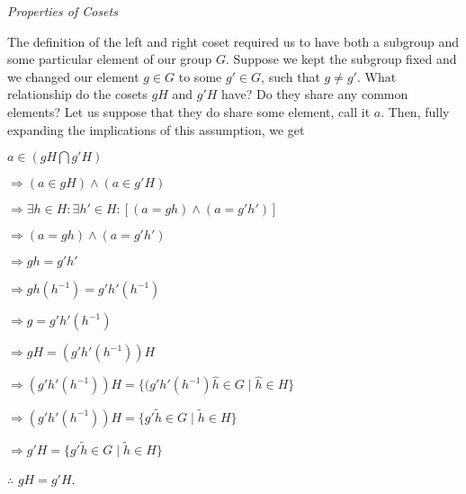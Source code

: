 \documentclass[12pt, a4paper]{article}
\begin{document}
\begin{flushleft}

    \large{\textit{Properties of Cosets}}

\end{flushleft}
    
    The definition of the left and right coset required us to have both a subgroup and some particular element of our group $G$. Suppose we kept the subgroup fixed and we changed our element $g\in G$ to some $g'\in G$, such that $g\neq g'$. What relationship do the cosets $gH$ and $g'H$ have? Do they share any common elements? Let us suppose that they do share some element, call it $a$. Then, fully expanding the implications of this assumption, we get\par
    
\vspace{4mm}

\hspace{2mm} $a\in (gH\bigcap g'H)$\par
\vspace{2mm}
\hspace{10mm} $\Rightarrow (a\in gH)\wedge(a\in g'H)$\par
\vspace{2mm}
\hspace{10mm} $\Rightarrow\exists h\in H\colon\exists h'\in H\colon[(a=gh)\wedge(a=g'h')]$\par
\vspace{2mm}
\hspace{10mm} $\Rightarrow (a=gh)\wedge(a=g'h')$\par
\vspace{2mm}
\hspace{10mm} $\Rightarrow gh=g'h'$\par
\vspace{2mm}
\hspace{10mm} $\Rightarrow gh(h^{-1})=g'h'(h^{-1})$\par
\vspace{2mm}
\hspace{10mm} $\Rightarrow g=g'h'(h^{-1})$\par
\vspace{2mm}
\hspace{10mm} $\Rightarrow gH=(g'h'(h^{-1}))H$\par
\vspace{2mm}
\hspace{10mm} $\Rightarrow (g'h'(h^{-1}))H=\{(g'h'(h^{-1})\hat{h}\in G\mid \hat{h}\in H\}$\par
\vspace{2mm}
\hspace{10mm} $\Rightarrow (g'h'(h^{-1}))H=\{g'\tilde{h}\in G\mid \tilde{h}\in H\}$\par
\vspace{2mm}
\hspace{10mm} $\Rightarrow g'H=\{g'\tilde{h}\in G\mid\tilde{h}\in H\}$\par
\vspace{2mm}
\hspace{2mm} $\therefore$\hspace{3mm} $gH=g'H$.\par
\newpage
\end{document}
